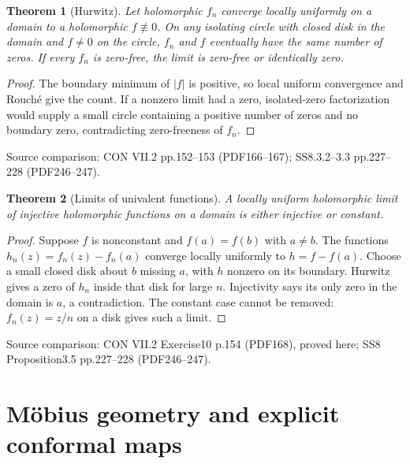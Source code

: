 \documentclass[11pt,a4paper,openany]{book}
\newtheorem{theorem}{Theorem}[chapter]
\theoremstyle{definition}
\theoremstyle{remark}\newtheorem{remark}[theorem]{Remark}
\newcommand{\family}[1]{}
\newcommand{\source}[1]{\par\begingroup\small\sffamily\color{black!65}Source comparison: #1\par\endgroup}
\begin{document}
\begin{theorem}[Hurwitz]\family{D12.09.05}\label{d12:09-05}
Let holomorphic $f_n$ converge locally uniformly on a domain to a holomorphic $f\not\equiv0$. On any isolating circle with closed disk in the domain and $f\ne0$ on the circle, $f_n$ and $f$ eventually have the same number of zeros. If every $f_n$ is zero-free, the limit is zero-free or identically zero.
\end{theorem}
\begin{proof}
The boundary minimum of $|f|$ is positive, so local uniform convergence and Rouch\'e give the count. If a nonzero limit had a zero, isolated-zero factorization would supply a small circle containing a positive number of zeros and no boundary zero, contradicting zero-freeness of $f_n$.
\end{proof}
\source{CON VII.2 pp.152--153 (PDF166--167); SS8.3.2--3.3 pp.227--228 (PDF246--247).}

\begin{theorem}[Limits of univalent functions]\family{D12.09.06}\label{d12:09-06}
A locally uniform holomorphic limit of injective holomorphic functions on a domain is either injective or constant.
\end{theorem}
\begin{proof}
Suppose $f$ is nonconstant and $f(a)=f(b)$ with $a\ne b$. The functions $h_n(z)=f_n(z)-f_n(a)$ converge locally uniformly to $h=f-f(a)$. Choose a small closed disk about $b$ missing $a$, with $h$ nonzero on its boundary. Hurwitz gives a zero of $h_n$ inside that disk for large $n$. Injectivity says its only zero in the domain is $a$, a contradiction. The constant case cannot be removed: $f_n(z)=z/n$ on a disk gives such a limit.
\end{proof}
\source{CON VII.2 Exercise10 p.154 (PDF168), proved here; SS8 Proposition3.5 pp.227--228 (PDF246--247).}


\chapter{M\"obius geometry and explicit conformal maps}\label{ch:d12-10}
\end{document}
